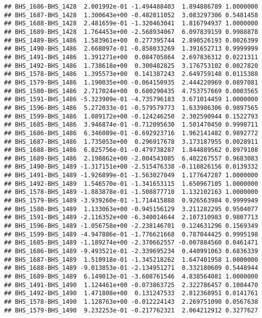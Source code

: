 \documentclass[]{article}
\begin{document}
\begin{verbatim}
## BHS_1686-BHS_1428  2.001992e-01 -1.494488403  1.894886789 1.0000000
## BHS_1687-BHS_1428  1.300643e+00 -0.482011052  3.083297306 0.5481458
## BHS_1688-BHS_1428  2.481659e-01 -1.320463041  1.816794937 1.0000000
## BHS_1689-BHS_1428  1.764453e+00 -2.568934067  6.097839159 0.9988878
## BHS_1489-BHS_1486  1.583961e+00  0.277395744  2.890526193 0.0026399
## BHS_1490-BHS_1486  2.668097e-01 -0.858033269  1.391652713 0.9999999
## BHS_1491-BHS_1486  1.391271e+00  0.084705864  2.697836312 0.0221311
## BHS_1492-BHS_1486  1.738618e+00  0.300482825  3.176753102 0.0027820
## BHS_1578-BHS_1486  1.395573e+00  0.141387243  2.649759148 0.0115388
## BHS_1579-BHS_1486  1.190035e+00 -0.064150935  2.444220969 0.0897081
## BHS_1580-BHS_1486  2.717024e+00  0.680290435  4.753757669 0.0003565
## BHS_1591-BHS_1486 -5.323909e-01 -4.735796183  3.671014459 1.0000000
## BHS_1596-BHS_1486  5.272033e-01 -0.579579773  1.633986306 0.9897565
## BHS_1599-BHS_1486  1.089172e+00 -0.124246250  2.302590944 0.1522793
## BHS_1685-BHS_1486  3.946874e-01 -0.712095630  1.501470450 0.9998711
## BHS_1686-BHS_1486  6.346089e-01 -0.692923716  1.962141482 0.9892772
## BHS_1687-BHS_1486  1.735053e+00  0.296917678  3.173187955 0.0028911
## BHS_1688-BHS_1486  6.825756e-01 -0.479738287  1.844889562 0.8979108
## BHS_1689-BHS_1486  2.198862e+00 -2.004543085  6.402267557 0.9683083
## BHS_1490-BHS_1489 -1.317151e+00 -2.515476338 -0.118826156 0.0139332
## BHS_1491-BHS_1489 -1.926899e-01 -1.563027049  1.177647287 1.0000000
## BHS_1492-BHS_1489  1.546570e-01 -1.341653115  1.650967105 1.0000000
## BHS_1578-BHS_1489 -1.883878e-01 -1.508877710  1.132102163 1.0000000
## BHS_1579-BHS_1489 -3.939260e-01 -1.714415888  0.926563984 0.9999949
## BHS_1580-BHS_1489  1.133063e+00 -0.945156129  3.211282295 0.9504077
## BHS_1591-BHS_1489 -2.116352e+00 -6.340014644  2.107310983 0.9807713
## BHS_1596-BHS_1489 -1.056758e+00 -2.238146701  0.124631296 0.1569349
## BHS_1599-BHS_1489 -4.947886e-01 -1.776621668  0.787044425 0.9995198
## BHS_1685-BHS_1489 -1.189274e+00 -2.370662557 -0.007884560 0.0461471
## BHS_1686-BHS_1489 -9.493521e-01 -2.339695234  0.440991063 0.6836339
## BHS_1687-BHS_1489  1.510918e-01 -1.345218262  1.647401958 1.0000000
## BHS_1688-BHS_1489 -9.013853e-01 -2.134951271  0.332180609 0.5448944
## BHS_1689-BHS_1489  6.149013e-01 -3.608761546  4.838564081 1.0000000
## BHS_1491-BHS_1490  1.124461e+00 -0.073863725  2.322786457 0.1004470
## BHS_1492-BHS_1490  1.471808e+00  0.131247533  2.812368951 0.0141761
## BHS_1578-BHS_1490  1.128763e+00 -0.012224143  2.269751090 0.0567638
## BHS_1579-BHS_1490  9.232253e-01 -0.217762321  2.064212912 0.3277627

\end{verbatim}
\end{document}
